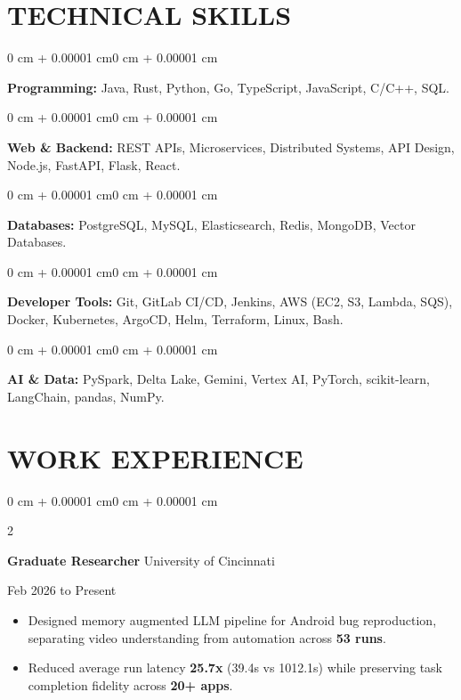 \documentclass[10pt, letterpaper]{article}
\newenvironment{highlights}{
    \begin{itemize}[
        topsep=0.10 cm,
        parsep=0.06 cm,
        partopsep=0pt,
        itemsep=0.06 cm,
        leftmargin=12pt
    ]
}{
    \end{itemize}
}
\newenvironment{onecolentry}{
    \begin{adjustwidth}{0 cm + 0.00001 cm}{0 cm + 0.00001 cm}
}{
    \end{adjustwidth}
}
\newenvironment{twocolentry}[2][]{
    \onecolentry
    \def\secondColumn{#2}
    \setcolumnwidth{\fill, 4.5 cm}
    \begin{paracol}{2}
}{
    \switchcolumn \raggedleft \secondColumn
    \end{paracol}
    \endonecolentry
}
\begin{document}
\section{TECHNICAL SKILLS}
\begin{onecolentry}
\textbf{Programming:} Java, Rust, Python, Go, TypeScript, JavaScript, C/C++, SQL.
\end{onecolentry}
\vspace{0.06 cm}
\begin{onecolentry}
\textbf{Web \& Backend:} REST APIs, Microservices, Distributed Systems, API Design, Node.js, FastAPI, Flask, React.
\end{onecolentry}
\vspace{0.06 cm}
\begin{onecolentry}
\textbf{Databases:} PostgreSQL, MySQL, Elasticsearch, Redis, MongoDB, Vector Databases.
\end{onecolentry}
\vspace{0.06 cm}
\begin{onecolentry}
\textbf{Developer Tools:} Git, GitLab CI/CD, Jenkins, AWS (EC2, S3, Lambda, SQS), Docker, Kubernetes, ArgoCD, Helm, Terraform, Linux, Bash.
\end{onecolentry}
\vspace{0.06 cm}
\begin{onecolentry}
\textbf{AI \& Data:} PySpark, Delta Lake, Gemini, Vertex AI, PyTorch, scikit-learn, LangChain, pandas, NumPy.
\end{onecolentry}

\section{WORK EXPERIENCE}
\begin{twocolentry}{Feb 2026 to Present}
\textbf{Graduate Researcher} \textbar{} University of Cincinnati
\end{twocolentry}
\begin{highlights}
  \item Designed memory augmented LLM pipeline for Android bug reproduction, separating video understanding from automation across \textbf{53 runs}.
  \item Reduced average run latency \textbf{25.7x} (39.4s vs 1012.1s) while preserving task completion fidelity across \textbf{20+ apps}.
\end{highlights}

\vspace{0.15 cm}
\end{document}
